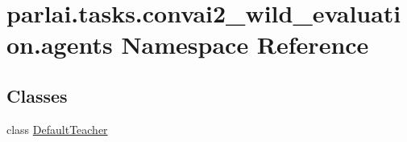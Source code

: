 \hypertarget{namespaceparlai_1_1tasks_1_1convai2__wild__evaluation_1_1agents}{}\section{parlai.\+tasks.\+convai2\+\_\+wild\+\_\+evaluation.\+agents Namespace Reference}
\label{namespaceparlai_1_1tasks_1_1convai2__wild__evaluation_1_1agents}
\subsection*{Classes}
\begin{DoxyCompactItemize}
\item 
class \hyperlink{classparlai_1_1tasks_1_1convai2__wild__evaluation_1_1agents_1_1DefaultTeacher}{Default\+Teacher}
\end{DoxyCompactItemize}
